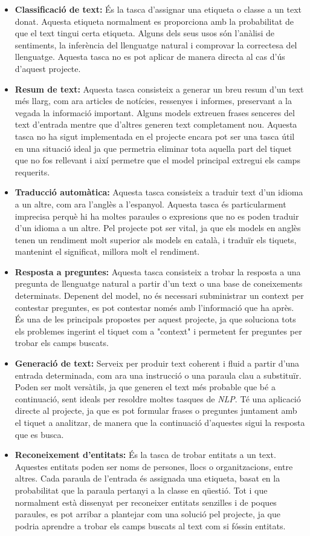 \begin{itemize}
    \item \textbf{Classificació de text:} És la tasca d'assignar una etiqueta o classe a un text donat. Aquesta etiqueta normalment es proporciona amb la probabilitat de que el text tingui certa etiqueta. Alguns dels seus usos són l'anàlisi de sentiments, la inferència del llenguatge natural i comprovar la correctesa del llenguatge. Aquesta tasca no es pot aplicar de manera directa al cas d'ús d'aquest projecte.
    \item \textbf{Resum de text:} Aquesta tasca consisteix a generar un breu resum d'un text més llarg, com ara articles de notícies, ressenyes i informes, preservant a la vegada la informació important. Alguns models extreuen frases senceres del text d'entrada mentre que d'altres generen text completament nou. Aquesta tasca no ha sigut implementada en el projecte encara pot ser una tasca útil en una situació ideal ja que permetria eliminar tota aquella part del tiquet que no fos rellevant i així permetre que el model principal extregui els camps requerits.
    \item \textbf{Traducció automàtica:} Aquesta tasca consisteix a traduir text d'un idioma a un altre, com ara l'anglès a l'espanyol. Aquesta tasca és particularment imprecisa perquè hi ha moltes paraules o expresions que no es poden traduir d'un idioma a un altre. Pel projecte pot ser vital, ja que els models en anglès tenen un rendiment molt superior als models en català, i traduïr els tiquets, mantenint el significat, millora molt el rendiment.
    \item \textbf{Resposta a preguntes:} Aquesta tasca consisteix a trobar la resposta a una pregunta de llenguatge natural a partir d'un text o una base de coneixements determinats. Depenent del model, no és necessari subministrar un context per contestar preguntes, es pot contestar només amb l'informació que ha après. És una de les principals propostes per aquest projecte, ja que soluciona tots els problemes ingerint el tiquet com a "context" i permetent fer preguntes per trobar els camps buscats.
    \item \textbf{Generació de text:} Serveix per produir text coherent i fluid a partir d'una entrada determinada, com ara una instrucció o una paraula clau a substituïr. Poden ser molt versàtils, ja que generen el text més probable que bé a continuació, sent ideals per resoldre moltes tasques de \textit{NLP}. Té una aplicació directe al projecte, ja que es pot formular frases o preguntes juntament amb el tiquet a analitzar, de manera que la continuació d'aquestes sigui la resposta que es busca.
    \item \textbf{Reconeixement d'entitats:} És la tasca de trobar entitats a un text. Aquestes entitats poden ser noms de persones, llocs o organitzacions, entre altres. Cada paraula de l'entrada és assignada una etiqueta, basat en la probabilitat que la paraula pertanyi a la classe en qüestió. Tot i que normalment està dissenyat per reconeixer entitats senzilles i de poques paraules, es pot arribar a plantejar com una solució pel projecte, ja que podria aprendre a trobar els camps buscats al text com si fóssin entitats.
\end{itemize}
